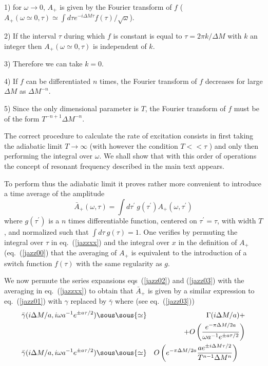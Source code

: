 \documentclass[12pt,oneside]{report}
\def\mettresous#1\sous#2{\mathrel{\mathop{\kern0pt #2}\limits_{#1}}}
\def\om{\omega	}
\begin{document}
1) for $\om \to
0$, $A_+$ is given by the Fourier transform of $f$ 
($A_+(\omega \simeq 0, \tau) \simeq \int d\tau e^{-i \Delta
M \tau} f(\tau) / \sqrt{\om}$). 

2) If the interval $\tau$
during which $f$ is constant is equal to $\tau = 2 \pi k /
\Delta M$ with $k$ an integer then $A_+(\om\simeq 0,\tau)$ is
independent of $k$. 

3) Therefore we can take $k=0$. 

4) If $f$
can be differentiated $n$ times, the Fourier transform of
$f$ decreases for large $\Delta M$ as $\Delta M ^{-n}$. 

5)
Since the only dimensional parameter is $T$, the Fourier
transform of $f$  must be of the form   $T^{-n+1} \Delta
M^{-n}$. 

\noindent The correct procedure to calculate
the rate of excitation consists in first taking the
adiabatic limit $T \to \infty$ (with however the condition
$T << \tau$ ) and only then
performing the integral over $\omega$. We shall show that
with this order of operations the concept of resonant
frequency described in the main text appears. 

To perform thus the adiabatic limit
it proves rather more convenient to introduce a time average of the amplitude
\begin{equation}
\bar A_+(\om,\tau) = \int\! d \tau^\prime
\ g(\tau^\prime) A_+(\om, \tau^\prime)\label{jazzxx}
\end{equation} 
where $g(\tau^\prime)$ is a $n$ times
differentiable function, centered on $\tau^\prime=\tau$, with width
$T$, and normalized such that $\int \! d\tau\ g(\tau) =1$.
One verifies by permuting the integral over $\tau$ in
eq.~(\ref{jazzxx}) and the integral over $x$ in the definition of
$A_+$ (eq.~(\ref{jazz00}) that the averaging of $A_+$ is
equivalent to the introduction of a switch function
$f(\tau)$ with the same regularity as $g$.

We now permute the series expansions eqs~(\ref{jazz02}) and
(\ref{jazz03}) with the averaging in eq.~(\ref{jazzxx}) to
obtain that $\bar A_+ $ is given by a similar
expression to eq.~(\ref{jazz01}) with $\gamma$ replaced by
$\bar \gamma $ where 
(see eq.~(\ref{jazz03}))
\begin{eqnarray}
\bar  \gamma (i\Delta M/a , i \omega a^{-1}
e^{\pm a \tau / 2})
&\mettresous{\frac{\omega 
e^{\pm a \tau / 2}}{a} \to \infty}\sous{\simeq}&
 \Gamma ( i\Delta M / a) + \nonumber\\
&\ &\!\!\!\!+ O\left({e^{- \pi \Delta M / 2a}
\over \omega a^{-1}
e^{\pm a \tau / 2} } \right)
\label{jazz04}
\\
\bar  \gamma (i\Delta M/a , i \omega a^{-1}
e^{\pm a \tau / 2})
&\mettresous{\frac{\omega 
e^{\pm a \tau / 2}}{a} \to 0}\sous{\simeq} &
 O\left(e^{- \pi \Delta M / 2a}
{a e^{\pm i\Delta M \tau/2} \over T^{n-1} \Delta M^n}\right) \quad 
\label{jazz05}
\end{eqnarray}
\end{document}
